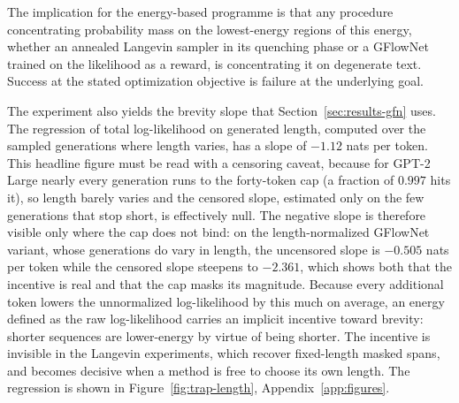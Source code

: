 

The implication for the energy-based programme is that any procedure concentrating probability mass on the lowest-energy regions of this energy, whether an annealed Langevin sampler in its quenching phase or a GFlowNet trained on the likelihood as a reward, is concentrating it on degenerate text. Success at the stated optimization objective is failure at the underlying goal.

The experiment also yields the brevity slope that Section~\ref{sec:results-gfn} uses. The regression of total log-likelihood on generated length, computed over the sampled generations where length varies, has a slope of $-1.12$ nats per token.
This headline figure must be read with a censoring caveat, because for GPT-2 Large nearly every generation runs to the forty-token cap (a fraction of $0.997$ hits it), so length barely varies and the censored slope, estimated only on the few generations that stop short, is effectively null. The negative slope is therefore visible only where the cap does not bind: on the length-normalized GFlowNet variant, whose generations do vary in length, the uncensored slope is $-0.505$ nats per token while the censored slope steepens to $-2.361$, which shows both that the incentive is real and that the cap masks its magnitude.
Because every additional token lowers the unnormalized log-likelihood by this much on average, an energy defined as the raw log-likelihood carries an implicit incentive toward brevity: shorter sequences are lower-energy by virtue of being shorter. The incentive is invisible in the Langevin experiments, which recover fixed-length masked spans, and becomes decisive when a method is free to choose its own length. The regression is shown in Figure~\ref{fig:trap-length}, Appendix~\ref{app:figures}.


